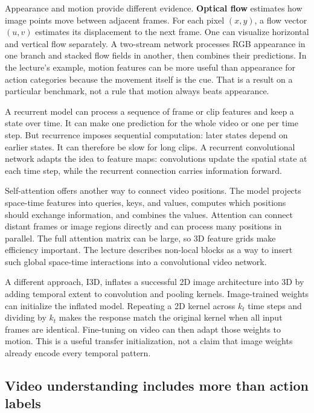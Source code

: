 Appearance and motion provide different evidence. \textbf{Optical flow} estimates how image points move between adjacent frames. For each pixel \((x,y)\), a flow vector \((u,v)\) estimates its displacement to the next frame. One can visualize horizontal and vertical flow separately. A two-stream network processes RGB appearance in one branch and stacked flow fields in another, then combines their predictions. In the lecture's example, motion features can be more useful than appearance for action categories because the movement itself is the cue. That is a result on a particular benchmark, not a rule that motion always beats appearance.

A recurrent model can process a sequence of frame or clip features and keep a state over time. It can make one prediction for the whole video or one per time step. But recurrence imposes sequential computation: later states depend on earlier states. It can therefore be slow for long clips. A recurrent convolutional network adapts the idea to feature maps: convolutions update the spatial state at each time step, while the recurrent connection carries information forward.

Self-attention offers another way to connect video positions. The model projects space-time features into queries, keys, and values, computes which positions should exchange information, and combines the values. Attention can connect distant frames or image regions directly and can process many positions in parallel. The full attention matrix can be large, so 3D feature grids make efficiency important. The lecture describes non-local blocks as a way to insert such global space-time interactions into a convolutional video network.

A different approach, I3D, inflates a successful 2D image architecture into 3D by adding temporal extent to convolution and pooling kernels. Image-trained weights can initialize the inflated model. Repeating a 2D kernel across \(k_t\) time steps and dividing by \(k_t\) makes the response match the original kernel when all input frames are identical. Fine-tuning on video can then adapt those weights to motion. This is a useful transfer initialization, not a claim that image weights already encode every temporal pattern.

\subsection{Video understanding includes more than action labels}\label{04-visual-computing-ii-ch031-video-understanding-includes-more-than-action-labels}

